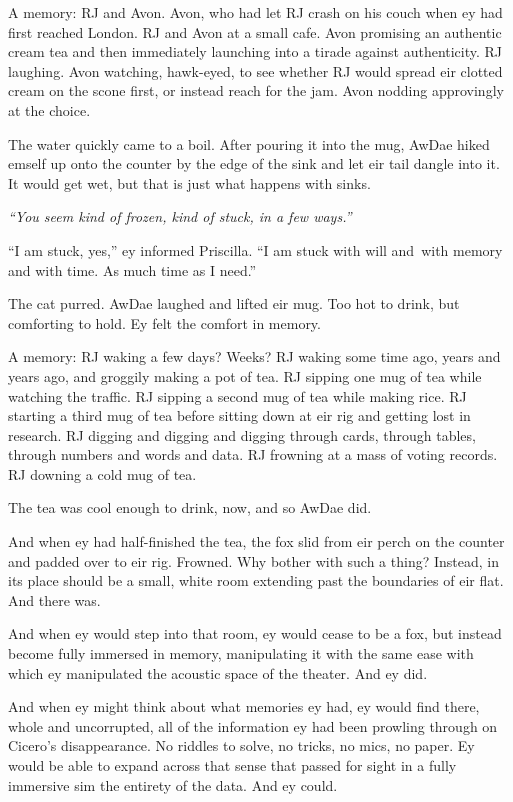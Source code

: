 A memory: RJ and Avon. Avon, who had let RJ crash on his couch when ey had first reached London. RJ and Avon at a small cafe. Avon promising an authentic cream tea and then immediately launching into a tirade against authenticity. RJ laughing. Avon watching, hawk-eyed, to see whether RJ would spread eir clotted cream on the scone first, or instead reach for the jam. Avon nodding approvingly at the choice.

The water quickly came to a boil. After pouring it into the mug, AwDae hiked emself up onto the counter by the edge of the sink and let eir tail dangle into it. It would get wet, but that is just what happens with sinks.

\emph{``You seem kind of frozen, kind of stuck, in a few ways.''}

``I am stuck, yes,'' ey informed Priscilla. ``I am stuck with will and\pagebreak\ with memory and with time. As much time as I need.''

The cat purred. AwDae laughed and lifted eir mug. Too hot to drink, but comforting to hold. Ey felt the comfort in memory.

A memory: RJ waking a few days? Weeks? RJ waking some time ago, years and years ago, and groggily making a pot of tea. RJ sipping one mug of tea while watching the traffic. RJ sipping a second mug of tea while making rice. RJ starting a third mug of tea before sitting down at eir rig and getting lost in research. RJ digging and digging and digging through cards, through tables, through numbers and words and data. RJ frowning at a mass of voting records. RJ downing a cold mug of tea.

The tea was cool enough to drink, now, and so AwDae did.

And when ey had half-finished the tea, the fox slid from eir perch on the counter and padded over to eir rig. Frowned. Why bother with such a thing? Instead, in its place should be a small, white room extending past the boundaries of eir flat. And there was.

And when ey would step into that room, ey would cease to be a fox, but instead become fully immersed in memory, manipulating it with the same ease with which ey manipulated the acoustic space of the theater. And ey did.

And when ey might think about what memories ey had, ey would find there, whole and uncorrupted, all of the information ey had been prowling through on Cicero's disappearance. No riddles to solve, no tricks, no mics, no paper. Ey would be able to expand across that sense that passed for sight in a fully immersive sim the entirety of the data. And ey could.

